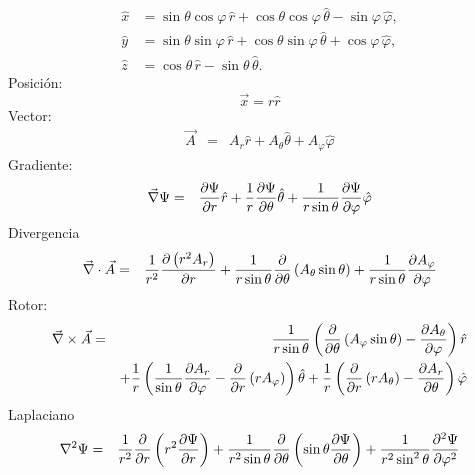 \begin{align}
    \hat{x} &= \sin \theta \cos \varphi \,\hat{r} + \cos \theta \cos \varphi \,\hat{\theta} - \sin \varphi \,\hat{\varphi},\\
    \hat{y} &= \sin \theta \sin\varphi \,\hat{r} + \cos \theta \sin \varphi \,\hat{\theta} + \cos \varphi \,\hat{\varphi}, \\
    \hat{z} &= \cos \theta \,\hat{r} - \sin \theta \,\hat{\theta}.
\end{align}
Posición:
\begin{equation}
\vec{x} = r \hat{r}
\end{equation}
Vector:
\begin{eqnarray}
\vec{A}
&=& A_r {\hat r} + A_\theta {\hat \theta} +
A_\varphi {\hat \varphi}
\end{eqnarray}
Gradiente:
\begin{eqnarray}
 \vec\nabla\Psi
 &=& {\partial\Psi\over \partial r} {\hat r}
  + {1 \over r}{\partial\Psi\over \partial \theta} {\hat \theta}
  + {1 \over r\sin\theta}{\partial\Psi\over \partial \varphi} {\hat \varphi}
\end{eqnarray}
Divergencia
\begin{eqnarray}
 \vec\nabla \cdot \vec{A}
&=& {1 \over r^2}{\partial \left( r^2 A_r \right) \over \partial r}
  + {1 \over r\sin\theta}{\partial \over \partial \theta} \left(
A_\theta\sin\theta \right)
  + {1 \over r\sin\theta}{\partial A_\varphi \over \partial \varphi}
\end{eqnarray}
Rotor:
\begin{eqnarray}
\vec\nabla \times  \vec{A}
&=&  {1 \over r\sin\theta}\left({\partial \over \partial \theta}
\left( A_\varphi\sin\theta \right)    - {\partial A_\theta \over \partial
\varphi}\right) {\hat r} \nonumber\\
&&+    {1 \over r}\left({1 \over \sin\theta}{\partial A_r \over \partial
\varphi} - {\partial \over \partial r} \left( r A_\varphi \right) \right)
 {\hat \theta}  +   {1 \over r}\left({\partial \over \partial r} \left( r
A_\theta
\right)  - {\partial A_r \over \partial \theta}\right)  {\hat \varphi}
\end{eqnarray}
Laplaciano
\begin{eqnarray}
 \nabla^2 \Psi
&=&  {1 \over r^2}{\partial \over \partial r}\left(r^2 {\partial\Psi\over
\partial r}\right)   + {1 \over r^2\sin\theta}{\partial \over \partial
\theta}\left(\sin\theta {\partial\Psi\over \partial \theta}\right)
  + {1 \over r^2\sin^2\theta}{\partial^2\Psi\over \partial \varphi^2}
\end{eqnarray}
